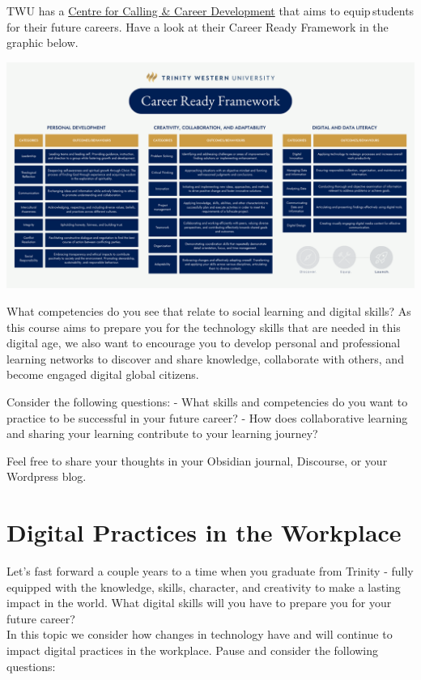 \documentclass[
]{book}
\theoremstyle{definition}
\theoremstyle{definition}
\theoremstyle{definition}
\theoremstyle{definition}
\theoremstyle{remark}
\begin{document}
\begin{reflect}
TWU has a \href{https://www.twu.ca/academics/academic-professional-support/centre-calling-career-development}{Centre for Calling \& Career Development} that aims to equip\,students for their future careers. Have a look at their Career Ready Framework in the graphic below.

\includegraphics{assets/u6/Competency Framework.png}

What competencies do you see that relate to social learning and digital skills? As this course aims to prepare you for the technology skills that are needed in this digital age, we also want to encourage you to develop personal and professional learning networks to discover and share knowledge, collaborate with others, and become engaged digital global citizens.

Consider the following questions:
- What skills and competencies do you want to practice to be successful in your future career?
- How does collaborative learning and sharing your learning contribute to your learning journey?

Feel free to share your thoughts in your Obsidian journal, Discourse, or your Wordpress blog.
\end{reflect}

\hypertarget{digital-practices-in-the-workplace}{%
\section{Digital Practices in the Workplace}\label{digital-practices-in-the-workplace}}

Let's fast forward a couple years to a time when you graduate from Trinity - fully equipped with the knowledge, skills, character, and creativity to make a lasting impact in the world. What digital skills will you have to prepare you for your future career?\\
In this topic we consider how changes in technology have and will continue to impact digital practices in the workplace. Pause and consider the following questions:
\end{document}
